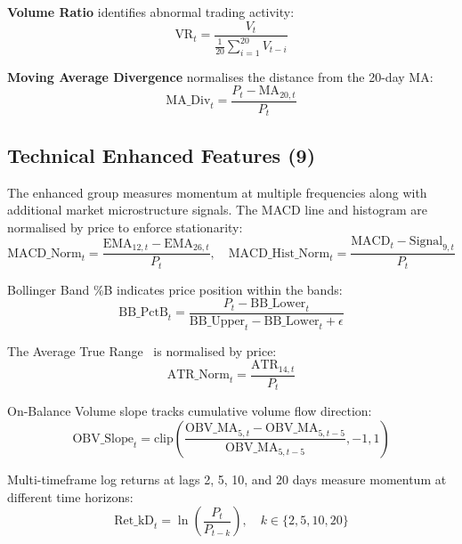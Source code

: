\documentclass[10pt,a4paper,twoside]{article}
\begin{document}
\textbf{Volume Ratio} identifies abnormal trading activity:
\begin{equation}
  \text{VR}_t = \frac{V_t}{\frac{1}{20}\sum_{i=1}^{20}V_{t-i}}
\end{equation}

\textbf{Moving Average Divergence} normalises the distance from the 20-day MA:
\begin{equation}
  \text{MA\_Div}_t = \frac{P_t - \text{MA}_{20,t}}{P_t}
\end{equation}

\subsection{Technical Enhanced Features (9)}

The enhanced group measures momentum at multiple frequencies along with
additional market microstructure signals. The MACD line and histogram are
normalised by price to enforce stationarity:
\begin{equation}
  \text{MACD\_Norm}_t = \frac{\text{EMA}_{12,t} - \text{EMA}_{26,t}}{P_t}, \quad
  \text{MACD\_Hist\_Norm}_t = \frac{\text{MACD}_t - \text{Signal}_{9,t}}{P_t}
\end{equation}

Bollinger Band \%B indicates price position within the bands:
\begin{equation}
  \text{BB\_PctB}_t = \frac{P_t - \text{BB\_Lower}_t}{\text{BB\_Upper}_t - \text{BB\_Lower}_t + \epsilon}
\end{equation}

The Average True Range~\cite{wilder1978} is normalised by price:
\begin{equation}
  \text{ATR\_Norm}_t = \frac{\text{ATR}_{14,t}}{P_t}
\end{equation}

On-Balance Volume slope tracks cumulative volume flow direction:
\begin{equation}
  \text{OBV\_Slope}_t = \text{clip}\!\left(\frac{\text{OBV\_MA}_{5,t} - \text{OBV\_MA}_{5,t-5}}{\text{OBV\_MA}_{5,t-5}}, -1, 1\right)
\end{equation}

Multi-timeframe log returns at lags 2, 5, 10, and 20 days measure momentum at
different time horizons:
\begin{equation}
  \text{Ret\_kD}_t = \ln\!\left(\frac{P_t}{P_{t-k}}\right), \quad k \in \{2, 5, 10, 20\}
\end{equation}
\end{document}
